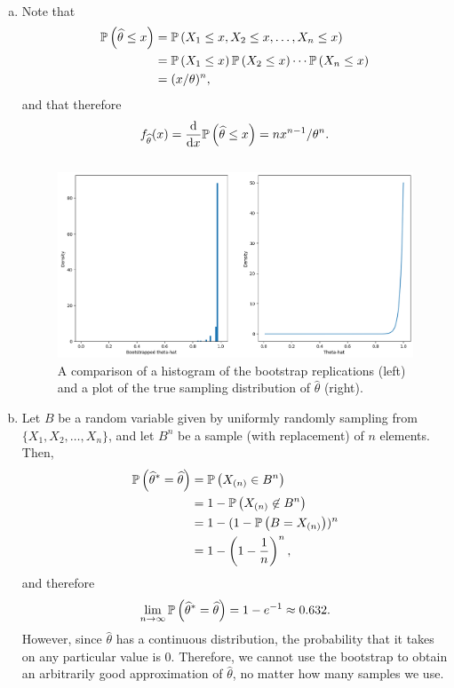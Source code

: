 \begin{ex}~
  \begin{enumerate}[(a)]
    \item Note that
          \begin{align*}
            \P{\widehat{\theta}\leq x}
             & =\P{X_1\leq x,X_2\leq x,\ldots,X_n\leq x}      \\
             & =\P{X_1\leq x}\P{X_2\leq x}\cdots\P{X_n\leq x} \\
             & =(x/\theta)^n,
          \end{align*}
          and that therefore
          \[
            f_{\widehat{\theta}}(x)
            =\frac{\d}{\d{x}}\P{\widehat{\theta}\leq x}
            =n x^{n-1}/\theta^n.
          \]

          \inputminted{python}{../code/08-07.py}

          \begin{figure}[H]
            \centering
            \includegraphics[scale=0.54]{../images/08-07}
            \caption{A comparison of a histogram of the bootstrap replications
              (left) and a plot of the true sampling distribution of
              $\widehat{\theta}$ (right).}
          \end{figure}
    \item Let $B$ be a random variable given by uniformly randomly sampling
          from $\{X_1,X_2,\ldots,X_n\}$, and let $B^n$ be a sample (with
          replacement) of $n$ elements. Then,
          \begin{align*}
            \P{\widehat{\theta}^*=\widehat{\theta}}
             & =\P{X_{(n)}\in B^n}              \\
             & =1-\P{X_{(n)}\not\in B^n}        \\
             & =1-(1-\P{B = X_{(n)}})^n         \\
             & =1-\left(1-\frac{1}{n}\right)^n,
          \end{align*}
          and therefore
          \[
            \lim_{n\to\infty}\P{\widehat{\theta}^*
              =\widehat{\theta}}
            =1-e^{-1}
            \approx 0.632.
          \]
          However, since $\widehat{\theta}$ has a continuous distribution, the
          probability that it takes on any particular value is $0$. Therefore,
          we cannot use the bootstrap to obtain an arbitrarily good
          approximation of $\widehat{\theta}$, no matter how many samples we
          use.
  \end{enumerate}
\end{ex}

